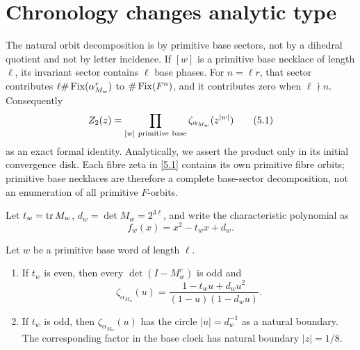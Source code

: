 \section{Chronology changes analytic type}
\label{sec:analytic-type}

The natural orbit decomposition is by primitive base sectors, not by a
dihedral quotient and not by letter incidence.  If \([w]\) is a primitive
base necklace of length \(\ell\), its invariant sector contains \(\ell\)
base phases.  For \(n=\ell r\), that sector contributes
\(\ell\#\operatorname{Fix}(\alpha_{M_w}^r)\) to \(\#\operatorname{Fix}(F^n)\), and it contributes zero
when \(\ell\nmid n\).  Consequently
\[
 Z_{2}(z)=
 \prod_{[w]\ \mathrm{primitive\ base}}
 \zeta_{\alpha_{M_w}}(z^{|w|})
 \tag{5.1}\label{5.1}
\]
as an exact formal identity.  Analytically, we assert the product only in its
initial convergence disk.  Each fibre zeta in \eqref{5.1} contains its own
primitive fibre orbits; primitive base necklaces are therefore a complete
base-sector decomposition, not an enumeration of all primitive \(F\)-orbits.

Let \(t_w=\operatorname{tr} M_w\), \(d_w=\det M_w=2^{3\ell}\), and write the characteristic
polynomial as
\[
 f_w(x)=x^2-t_wx+d_w.
 \tag{5.2}\label{5.2}
\]

\begin{theorem}
\label{thm:dichotomy}
Let \(w\) be a primitive base word of length \(\ell\).
\begin{enumerate}[leftmargin=*]
\item If \(t_w\) is even, then every \(\det(I-M_w^r)\) is odd and
\[
 \zeta_{\alpha_{M_w}}(u)
 =\frac{1-t_wu+d_wu^2}{(1-u)(1-d_wu)}.
 \tag{5.3}\label{5.3}
\]
\item If \(t_w\) is odd, then \(\zeta_{\alpha_{M_w}}(u)\) has the circle
\(|u|=d_w^{-1}\) as a natural boundary.  The corresponding factor in the
base clock has natural boundary \(|z|=1/8\).
\end{enumerate}
\end{theorem}

